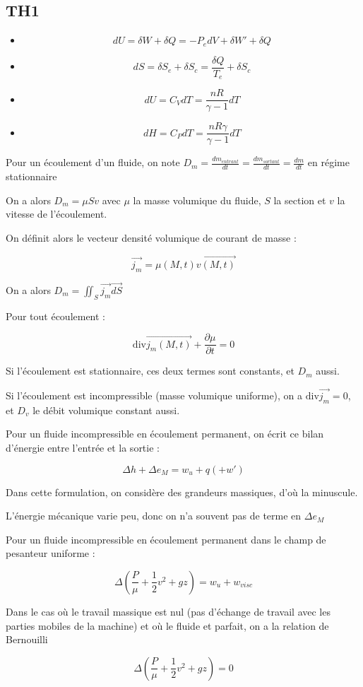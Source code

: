 \documentclass[a4paper,12pt]{book}
\newcommand{\Def}[2]{\begin{tcolorbox}[colback=white,colframe=red!10!green!20!blue!75!, title=Définition : #1]#2\end{tcolorbox}}
\newcommand{\Thr}[2]{\begin{tcolorbox}[sharp corners, colback=white,colframe=red!10!blue!30!green!75!, title=Théorème : #1]#2\end{tcolorbox}}
\newcommand{\Div}{\mathrm{div}}
\renewcommand{\Vec}[1]{\overrightarrow{#1}}
\begin{document}
\subsection{TH1}
\Thr{Identités thermodynamiques}{\begin{itemize}
\item $$dU = \delta W + \delta Q = -P_edV +\delta W' +\delta Q$$
\item $$dS = \delta S_e+\delta S_c = \frac{\delta Q}{T_e}+\delta S_c$$
\item $$dU = C_VdT = \frac{nR}{\gamma-1}dT$$
\item $$dH = C_PdT = \frac{nR\gamma}{\gamma-1}dT$$
\end{itemize}}
\Def{Débit massique}{Pour un écoulement d'un fluide, on note $D_m = \frac{dm_{entrant}}{dt} =\frac{dm_{sortant}}{dt}=\frac{dm}{dt}$ en régime stationnaire
\par On a alors $D_m = \mu S v$ avec $\mu$ la masse volumique du fluide, $S$ la section et $v$ la vitesse de l'écoulement.
\par On définit alors le vecteur densité volumique de courant de masse :
\par $$\Vec{j_m} = \mu(M,t)\Vec{v(M,t)}$$
\par On a alors $D_m = \iint_S\Vec{j_m}\Vec{dS}$}
\Thr{Conservation de la masse}{Pour tout écoulement :
\par $$\Div\Vec{j_m(M,t)}+\dfrac{\partial\mu}{\partial t}=0$$
\par Si l'écoulement est stationnaire, ces deux termes sont constants, et $D_m$ aussi.
\par Si l'écoulement est incompressible (masse volumique uniforme), on a $\Div\Vec{j_m}=0$, et $D_v$ le débit volumique constant aussi.}
\Thr{Premier principe en écoulement}{Pour un fluide incompressible en écoulement permanent, on écrit ce bilan d'énergie entre l'entrée et la sortie :
\par $$\Delta h+\Delta e_M=w_u+q(+w')$$
\par Dans cette formulation, on considère des grandeurs massiques, d'où la minuscule.
\par L'énergie mécanique varie peu, donc on n'a souvent pas de terme en $\Delta e_M$}
\Thr{Théorème de Bernouilli}{Pour un fluide incompressible en écoulement permanent dans le champ de pesanteur uniforme :
\par $$\Delta\left(\frac{P}{\mu}+\frac{1}{2}v^2+gz\right)=w_u+w_{visc}$$
\par Dans le cas où le travail massique est nul (pas d'échange de travail avec les parties mobiles de la machine) et où le fluide et parfait, on a la relation de Bernouilli
\par $$\Delta\left(\frac{P}{\mu}+\frac{1}{2}v^2+gz\right)=0$$}
\end{document}
